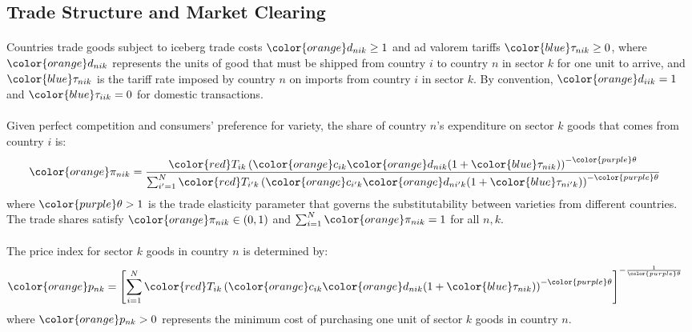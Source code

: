 \subsection{Trade Structure and Market Clearing}

\paragraph{} Countries trade goods subject to iceberg trade costs ${\color{orange}d_{nik}} \geq 1$ and ad valorem tariffs ${\color{blue}\tau_{nik}} \geq 0$, where ${\color{orange}d_{nik}}$ represents the units of good that must be shipped from country $i$ to country $n$ in sector $k$ for one unit to arrive, and ${\color{blue}\tau_{nik}}$ is the tariff rate imposed by country $n$ on imports from country $i$ in sector $k$. By convention, ${\color{orange}d_{iik}} = 1$ and ${\color{blue}\tau_{iik}} = 0$ for domestic transactions.

\paragraph{} Given perfect competition and consumers' preference for variety, the share of country $n$'s expenditure on sector $k$ goods that comes from country $i$ is:
\begin{align*}
    {\color{orange}\pi_{nik}} &= \frac{{\color{red}T_{ik}} \left({\color{orange}c_{ik}} {\color{orange}d_{nik}} (1 + {\color{blue}\tau_{nik}})\right)^{-{\color{purple}\theta}}}{\sum_{i'=1}^{N} {\color{red}T_{i'k}} \left({\color{orange}c_{i'k}} {\color{orange}d_{ni'k}} (1 + {\color{blue}\tau_{ni'k}})\right)^{-{\color{purple}\theta}}}
\end{align*}
where ${\color{purple}\theta > 1}$ is the trade elasticity parameter that governs the substitutability between varieties from different countries. The trade shares satisfy ${\color{orange}\pi_{nik}} \in (0,1)$ and $\sum_{i=1}^{N} {\color{orange}\pi_{nik}} = 1$ for all $n,k$.

\paragraph{} The price index for sector $k$ goods in country $n$ is determined by:
\begin{align*}
    {\color{orange}p_{nk}} &= \left[ \sum_{i=1}^{N} {\color{red}T_{ik}} \left({\color{orange}c_{ik}} {\color{orange}d_{nik}} (1 + {\color{blue}\tau_{nik}})\right)^{-{\color{purple}\theta}} \right]^{-\frac{1}{{\color{purple}\theta}}}
\end{align*}
where ${\color{orange}p_{nk}} > 0$ represents the minimum cost of purchasing one unit of sector $k$ goods in country $n$.

